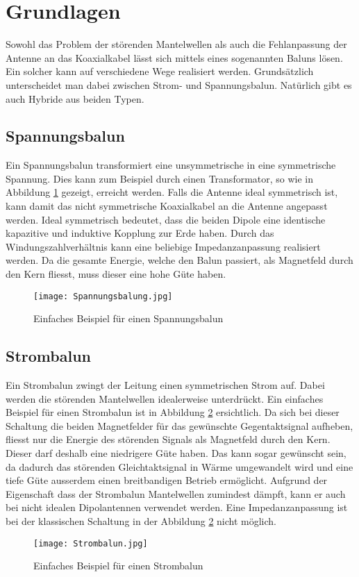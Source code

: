 \section{Grundlagen}

Sowohl das Problem der störenden Mantelwellen als auch die Fehlanpassung der Antenne an das Koaxialkabel lässt sich mittels eines sogenannten Baluns lösen. Ein solcher kann auf verschiedene Wege realisiert werden. Grundsätzlich unterscheidet man dabei zwischen Strom- und Spannungsbalun. Natürlich gibt es auch Hybride aus beiden Typen. 

\subsection{Spannungsbalun}
Ein Spannungsbalun transformiert eine unsymmetrische in eine symmetrische Spannung. Dies kann zum Beispiel durch einen Transformator, so wie in Abbildung \ref{fig:Spannungsbalun} gezeigt, erreicht werden. 
Falls die Antenne ideal symmetrisch ist, kann damit das nicht symmetrische Koaxialkabel an die Antenne angepasst werden. Ideal symmetrisch bedeutet, dass die beiden Dipole eine identische kapazitive und induktive Kopplung zur Erde haben. 
Durch das Windungszahlverhältnis kann eine beliebige Impedanzanpassung realisiert werden. 
Da die gesamte Energie, welche den Balun passiert, als Magnetfeld durch den Kern fliesst, muss dieser eine hohe Güte haben.
\begin{figure}[H]
	\centering
	\texttt{[image: Spannungsbalung.jpg]}
	\caption{Einfaches Beispiel für einen Spannungsbalun}\label{fig:Spannungsbalun}
\end{figure}

\subsection{Strombalun}
Ein Strombalun zwingt der Leitung einen symmetrischen Strom auf. Dabei werden die störenden Mantelwellen idealerweise unterdrückt. Ein einfaches Beispiel für einen Strombalun ist in Abbildung \ref{fig:Strombalun} ersichtlich. Da sich bei dieser Schaltung die beiden Magnetfelder für das gewünschte Gegentaktsignal aufheben, fliesst nur die Energie des störenden Signals als Magnetfeld durch den Kern. Dieser darf deshalb eine niedrigere Güte haben. Das kann sogar gewünscht sein, da dadurch das störenden Gleichtaktsignal in Wärme umgewandelt wird und eine tiefe Güte ausserdem einen breitbandigen Betrieb ermöglicht. Aufgrund der Eigenschaft dass der Strombalun Mantelwellen zumindest dämpft, kann er auch bei nicht idealen Dipolantennen verwendet werden. Eine Impedanzanpassung ist bei der klassischen Schaltung in der Abbildung \ref{fig:Strombalun} nicht möglich.
\begin{figure}[H]
	\centering
	\texttt{[image: Strombalun.jpg]}
	\caption{Einfaches Beispiel für einen Strombalun}\label{fig:Strombalun}
\end{figure}

